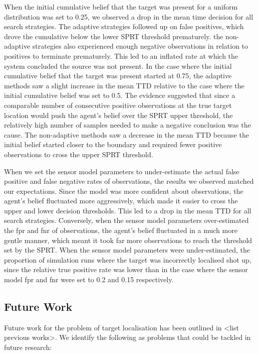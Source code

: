 When the initial cumulative belief that the target was present for a uniform distribution was set to 0.25, we observed a drop in the mean time decision for all search strategies. The adaptive strategies followed up on false positives, which drove the cumulative below the lower SPRT threshold prematurely. the non-adaptive strategies also experienced enough negative observations in relation to positives to terminate prematurely. This led to an inflated rate at which the system concluded the source was not present. In the case where the initial cumulative belief that the target was present started at 0.75, the adaptive methods saw a slight increase in the mean TTD relative to the case where the initial cumulative belief was set to 0.5. The evidence suggested that since a comparable number of consecutive positive observations at the true target location would push the agent's belief over the SPRT upper threshold, the relatively high number of samples needed to make a negative conclusion was the cause. The non-adaptive methods saw a decrease in the mean TTD because the initial belief started closer to the boundary and required  fewer positive observations to cross the upper SPRT threshold.\par


When we set the sensor model parameters to under-estimate the actual false positive and false negative rates of observations, the results we observed matched our expectations. Since the model was more confident about observations, the agent's belief fluctuated more aggressively, which made it easier to cross the upper and lower decision thresholds. This led to a drop in the mean TTD for all search strategies. Conversely, when the sensor model parameters over-estimated the fpr and fnr of observations, the agent's belief fluctuated in a much more gentle manner, which meant it took far more observations to reach the threshold set by the SPRT. When the sensor model parameters were under-estimated, the proportion of simulation runs where the target was incorrectly localised shot up, since the relative true positive rate was lower than in the case where the sensor model fpr and fnr were set to 0.2 and 0.15 respectively.



\subsection{Future Work}
Future work for the problem of target localisation has been outlined in <list previous works>. We identify the following as problems that could be tackled in future research:

